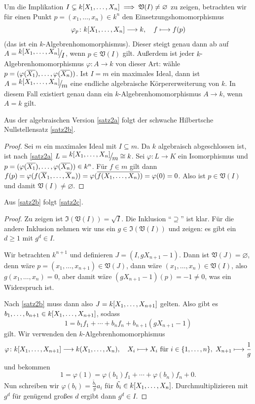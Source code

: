 \documentclass[a4paper,12pt]{scrbook}
\newtheorem{proof}{Beweis}
\def\V{\mathfrak{V}}
\def\I{\mathfrak{I}}
\newcommand{\ra}{\longrightarrow}
\renewcommand{\phi}{\varphi}
\newcommand{\leer}{\ensuremath{\varnothing}}
\renewcommand{\mapsto}{\longmapsto}
\def\Bar#1{\ensuremath\overline{#1}}
\newcommand{\Quotient}[2]{
  \raisebox{0.7ex}{\ensuremath{#1}}
  \ensuremath{\mkern-3mu}\big/\ensuremath{\mkern-3mu}
  \raisebox{-0.6ex}{\ensuremath{#2}}}
\newcommand{\polyx}[1][n]{\ensuremath%
  [X_{1},\dotsc,X_{#1}]}
\begin{document}

Um die Implikation $I\subsetneq k\polyx \implies \V(I)\neq\leer$ zu zeigen, betrachten wir für einen Punkt $p=(x_1,\dotsc,x_n)\in
k^n$ den Einsetzungshomomorphismus \[ \phi_p\colon k\polyx \ra k, \quad f\mapsto f(p) \] (das ist ein
$k$-Algebrenhomomorphismus). Dieser steigt genau dann ab auf $A=\Quotient{k\polyx}{I}$, wenn $p\in\V(I)$ gilt. Außerdem ist jeder
$k$-Algebrenhomomorphismus $\phi\colon A\ra k$ von dieser Art: wähle $p=(\phi(\Bar{X_1}),\dotsc,\phi(\Bar{X_n}))$. Ist $I=m$ ein
maximales Ideal, dann ist $A=\Quotient{k\polyx}{m}$ eine endliche algebraische Körpererweiterung von $k$. In diesem Fall
existiert genau dann ein $k$-Algebrenhomomorphismus $A\ra k$, wenn $A=k$ gilt.

\begin{lem}\label{1.3.4}
  Aus der algebraischen Version \ref{satz2a} folgt der schwache Hilbertsche Nullstellensatz \ref{satz2b}.
\end{lem}
\begin{proof}
  Sei $m$ ein maximales Ideal mit $I\subseteq m$. Da $k$ algebraisch abgeschlossen ist, ist nach \ref{satz2a}
  $L=\Quotient{k\polyx}{m}\cong k$. Sei $\phi\colon L\ra K$ ein Isomorphismus und $p=(\phi(\Bar{X_1}),\dotsc,\phi(\Bar{X_n}))\in
  k^n$. Für $f\in m$ gilt dann $f(p)=\phi(f(\Bar{X}_1,\dotsc,\Bar{X}_n))=\phi(\Bar{f(X_1,\dotsc,X_n)}) = \phi(0)=0$. Also ist
  $p\in\V(I)$ und damit $\V(I)\neq\leer$.
\end{proof}

\begin{lem}
  Aus \ref{satz2b} folgt \ref{satz2c}.
\end{lem}
\begin{proof}
Zu zeigen ist $\I(\V(I))=\sqrt{I}$. Die Inklusion \enquote{$\supseteq$} ist klar. Für die andere Inklusion nehmen wir uns ein
$g\in\I(\V(I))$ und zeigen: es gibt ein $d\ge1$ mit $g^d\in I$.

Wir betrachten $k^{n+1}$ und definieren $J=(I,gX_{n+1}-1)$. Dann ist $\V(J)=\leer$, denn wäre
$p=(x_1,\dotsc,x_{n+1})\in\V(J)$, dann wäre $(x_1,\dotsc,x_n)\in\V(I)$, also $g(x_1,\dotsc,x_n)=0$, aber damit wäre
$(gX_{n+1}-1)(p)=-1\neq0$, was ein Widerspruch ist.

Nach \ref{satz2b} muss dann also $J=k\polyx[n+1]$ gelten. Also gibt es $b_1,\dotsc,b_{n+1}\in k\polyx[n+1]$, sodass
\[ 1=b_1f_1 + \dotsm + b_nf_n + b_{n+1}(gX_{n+1}-1) \] gilt. Wir verwenden den $k$-Algebrenhomomorphismus
\[ \phi\colon k\polyx[n+1] \ra k(X_1,\dotsc,X_n),\quad X_i\mapsto X_i \text{ für } i\in\{1,\dotsc,n\},\ X_{n+1}\mapsto\frac1g \]
und bekommen
\[ 1 = \phi(1) = \phi(b_1)f_1 + \dotsm + \phi(b_n)f_n + 0. \]
Nun schreiben wir $\phi(b_i)=\frac{\tilde{b_i}}{g}a_i$ für $\tilde{b_i}\in k\polyx$. Durchmultiplizieren mit $g^d$ für genügend
großes $d$ ergibt dann $g^d\in I$.
\end{proof}
\end{document}
